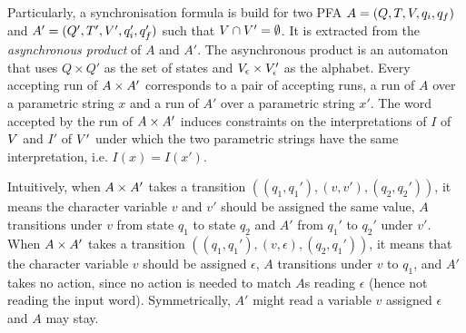 \documentclass[sigplan,review,anonymous]{acmart}\settopmatter{printfolios=true,printccs=false,printacmref=false}
\begin{document}
Particularly, a synchronisation formula is build for two PFA  
$A = (Q,T,V,q_i,q_f)$ and ${A'} = (Q',T',V',q_i',q_f')$ such that $V \cap V' = \emptyset$. 
%
It is extracted from the \emph{asynchronous product} of $A$ and $A'$. 
%
The asynchronous product is an automaton that uses $Q\times Q'$ as the set of states and 
$V_\epsilon\times V'_\epsilon$
as the alphabet. 
%
Every accepting run of $A \times A'$ corresponds to a pair of accepting runs, 
a run of $A$ over a parametric string $x$ and a run of ${A'}$ over a parametric string $x'$. 
The word accepted by the run of $A \times A'$ induces constraints on the interpretations of $I$ of $V$ and $I'$ of $V'$ under which the two parametric strings have the same interpretation, i.e. $I(x) = I(x')$. 

Intuitively, when $A \times A'$ takes a transition $((q_1,q_1'), (v,v'),(q_2,q_2'))$, 
it means the character variable $v$ and $v'$ should be assigned the same value,
$A$ transitions under $v$ from state $q_1$ to state $q_2$ and ${A'}$ from $q_1'$ to $q_2'$ under $v'$.
%
When $A \times A'$ takes a transition $((q_1,q_1'), (v,\epsilon),(q_2,q_1'))$, 
it means that the character variable $v$ should be assigned $\epsilon$, 
$A$ transitions under $v$ to $q_1$, and ${A'}$ takes no action, since no action is needed to match $A$s reading $\epsilon$ (hence not reading the input word). Symmetrically, ${A'}$ might read a variable $v$ assigned $\epsilon$ and $A$ may stay.
\end{document}
